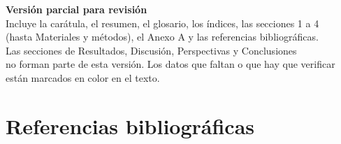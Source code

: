 \documentclass[12pt,a4paper,oneside]{report}
\begin{document}


\clearpage
\thispagestyle{empty}
\vspace*{0.3\textheight}
\begin{center}
  {\large\textbf{Versión parcial para revisión}}\\[0.8em]
  Incluye la carátula, el resumen, el glosario, los índices, las secciones 1 a 4\\
  (hasta Materiales y métodos), el Anexo A y las referencias bibliográficas.\\[0.8em]
  Las secciones de Resultados, Discusión, Perspectivas y Conclusiones\\
  no forman parte de esta versión. Los datos que faltan o que hay que verificar\\
  están marcados en color en el texto.
\end{center}




\tableofcontents
\clearpage
\listoffigures
\listoftables

\clearpage
{}







\chapter*{Referencias bibliográficas}
\printbibliography[heading=none]
\end{document}
